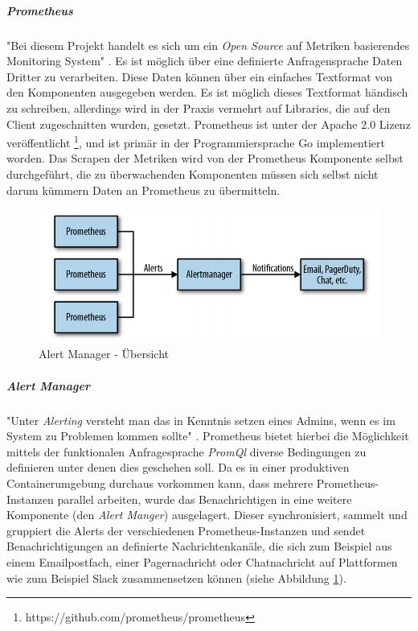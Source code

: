 \subparagraph{Prometheus}
"Bei diesem Projekt handelt es sich um ein \emph{Open Source} auf Metriken basierendes Monitoring System" \cite{oreillyPrometheus}. Es ist möglich über eine definierte Anfragensprache Daten Dritter zu verarbeiten. Diese Daten können über ein einfaches Textformat von den Komponenten ausgegeben werden. Es ist möglich dieses Textformat händisch zu schreiben, allerdings wird in der Praxis vermehrt auf Libraries, die auf den Client zugeschnitten wurden, gesetzt. Prometheus ist unter der Apache 2.0 Lizenz veröffentlicht \footnote{https://github.com/prometheus/prometheus}, und ist primär in der Programmiersprache Go implementiert worden. Das Scrapen der Metriken wird von der Prometheus Komponente selbst durchgeführt, die zu überwachenden Komponenten müssen sich selbst nicht darum kümmern Daten an Prometheus zu übermitteln.

\begin{figure}[ht!]
	\centering
	\includegraphics[width=.8\linewidth]{kapitel/problemloesung/implementierung/_img/alert-man-p307}
	\caption[Alert Manager - Übersicht]{Alert Manager - Übersicht \cite[Seite~307]{oreillyPrometheus}}
	\label{fig:alertManOverview}
\end{figure}

\subparagraph{Alert Manager}
"Unter \emph{Alerting} versteht man das in Kenntnis setzen eines Admins, wenn es im System zu Problemen kommen sollte" \cite[Kapitel~18]{oreillyPrometheus}. Prometheus bietet hierbei die Möglichkeit mittels der funktionalen Anfragesprache \emph{PromQl} diverse Bedingungen zu definieren unter denen dies geschehen soll. Da es in einer produktiven Containerumgebung durchaus vorkommen kann, dass mehrere Prometheus-Instanzen parallel arbeiten, wurde das Benachrichtigen in eine weitere Komponente (den \emph{Alert Manger}) ausgelagert. Dieser synchronisiert, sammelt und gruppiert die Alerts der verschiedenen Prometheus-Instanzen und sendet Benachrichtigungen an definierte Nachrichtenkanäle, die sich zum Beispiel aus einem Emailpostfach, einer Pagernachricht oder Chatnachricht auf Plattformen wie zum Beispiel Slack zusammensetzen können (siehe Abbildung \ref{fig:alertManOverview}).


